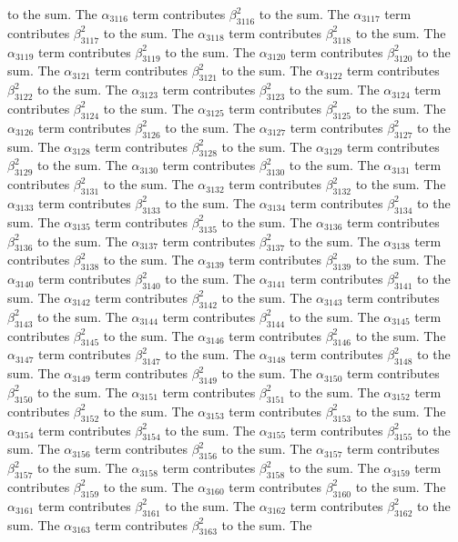 \begin{lemma}
to the sum. The $\alpha_{3116}$ term contributes $\beta_{3116}^{2}$ to the sum. The $\alpha_{3117}$ term contributes $\beta_{3117}^{2}$ to the sum. The $\alpha_{3118}$ term contributes $\beta_{3118}^{2}$ to the sum. The $\alpha_{3119}$ term contributes $\beta_{3119}^{2}$ to the sum. The $\alpha_{3120}$ term contributes $\beta_{3120}^{2}$ to the sum. The $\alpha_{3121}$ term contributes $\beta_{3121}^{2}$ to the sum. The $\alpha_{3122}$ term contributes $\beta_{3122}^{2}$ to the sum. The $\alpha_{3123}$ term contributes $\beta_{3123}^{2}$ to the sum. The $\alpha_{3124}$ term contributes $\beta_{3124}^{2}$ to the sum. The $\alpha_{3125}$ term contributes $\beta_{3125}^{2}$ to the sum. The $\alpha_{3126}$ term contributes $\beta_{3126}^{2}$ to the sum. The $\alpha_{3127}$ term contributes $\beta_{3127}^{2}$ to the sum. The $\alpha_{3128}$ term contributes $\beta_{3128}^{2}$ to the sum. The $\alpha_{3129}$ term contributes $\beta_{3129}^{2}$ to the sum. The $\alpha_{3130}$ term contributes $\beta_{3130}^{2}$ to the sum. The $\alpha_{3131}$ term contributes $\beta_{3131}^{2}$ to the sum. The $\alpha_{3132}$ term contributes $\beta_{3132}^{2}$ to the sum. The $\alpha_{3133}$ term contributes $\beta_{3133}^{2}$ to the sum. The $\alpha_{3134}$ term contributes $\beta_{3134}^{2}$ to the sum. The $\alpha_{3135}$ term contributes $\beta_{3135}^{2}$ to the sum. The $\alpha_{3136}$ term contributes $\beta_{3136}^{2}$ to the sum. The $\alpha_{3137}$ term contributes $\beta_{3137}^{2}$ to the sum. The $\alpha_{3138}$ term contributes $\beta_{3138}^{2}$ to the sum. The $\alpha_{3139}$ term contributes $\beta_{3139}^{2}$ to the sum. The $\alpha_{3140}$ term contributes $\beta_{3140}^{2}$ to the sum. The $\alpha_{3141}$ term contributes $\beta_{3141}^{2}$ to the sum. The $\alpha_{3142}$ term contributes $\beta_{3142}^{2}$ to the sum. The $\alpha_{3143}$ term contributes $\beta_{3143}^{2}$ to the sum. The $\alpha_{3144}$ term contributes $\beta_{3144}^{2}$ to the sum. The $\alpha_{3145}$ term contributes $\beta_{3145}^{2}$ to the sum. The $\alpha_{3146}$ term contributes $\beta_{3146}^{2}$ to the sum. The $\alpha_{3147}$ term contributes $\beta_{3147}^{2}$ to the sum. The $\alpha_{3148}$ term contributes $\beta_{3148}^{2}$ to the sum. The $\alpha_{3149}$ term contributes $\beta_{3149}^{2}$ to the sum. The $\alpha_{3150}$ term contributes $\beta_{3150}^{2}$ to the sum. The $\alpha_{3151}$ term contributes $\beta_{3151}^{2}$ to the sum. The $\alpha_{3152}$ term contributes $\beta_{3152}^{2}$ to the sum. The $\alpha_{3153}$ term contributes $\beta_{3153}^{2}$ to the sum. The $\alpha_{3154}$ term contributes $\beta_{3154}^{2}$ to the sum. The $\alpha_{3155}$ term contributes $\beta_{3155}^{2}$ to the sum. The $\alpha_{3156}$ term contributes $\beta_{3156}^{2}$ to the sum. The $\alpha_{3157}$ term contributes $\beta_{3157}^{2}$ to the sum. The $\alpha_{3158}$ term contributes $\beta_{3158}^{2}$ to the sum. The $\alpha_{3159}$ term contributes $\beta_{3159}^{2}$ to the sum. The $\alpha_{3160}$ term contributes $\beta_{3160}^{2}$ to the sum. The $\alpha_{3161}$ term contributes $\beta_{3161}^{2}$ to the sum. The $\alpha_{3162}$ term contributes $\beta_{3162}^{2}$ to the sum. The $\alpha_{3163}$ term contributes $\beta_{3163}^{2}$ to the sum. The 
\end{lemma}
